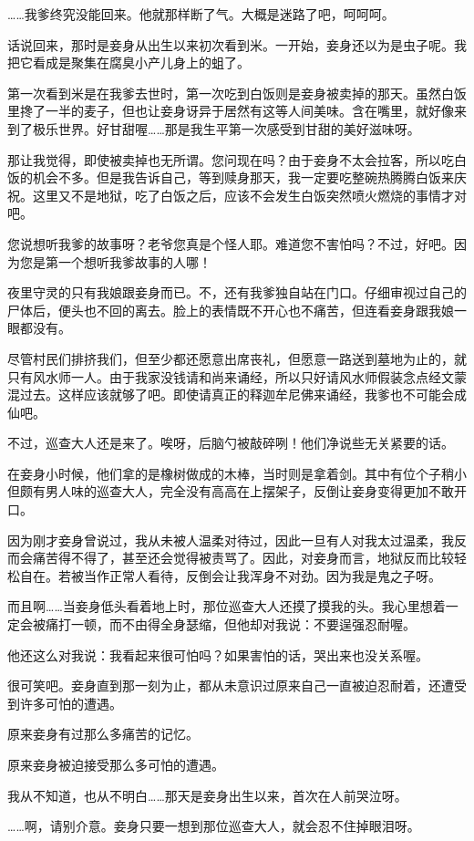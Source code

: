 \documentclass[portrait,a4paper]{article}
\begin{document}
……我爹终究没能回来。他就那样断了气。大概是迷路了吧，呵呵呵。

话说回来，那时是妾身从出生以来初次看到米。一开始，妾身还以为是虫子呢。我把它看成是聚集在腐臭小产儿身上的蛆了。

第一次看到米是在我爹去世时，第一次吃到白饭则是妾身被卖掉的那天。虽然白饭里搀了一半的麦子，但也让妾身讶异于居然有这等人间美味。含在嘴里，就好像来到了极乐世界。好甘甜喔……那是我生平第一次感受到甘甜的美好滋味呀。

那让我觉得，即使被卖掉也无所谓。您问现在吗？由于妾身不太会拉客，所以吃白饭的机会不多。但是我告诉自己，等到赎身那天，我一定要吃整碗热腾腾白饭来庆祝。这里又不是地狱，吃了白饭之后，应该不会发生白饭突然喷火燃烧的事情才对吧。

您说想听我爹的故事呀？老爷您真是个怪人耶。难道您不害怕吗？不过，好吧。因为您是第一个想听我爹故事的人哪！

夜里守灵的只有我娘跟妾身而已。不，还有我爹独自站在门口。仔细审视过自己的尸体后，便头也不回的离去。脸上的表情既不开心也不痛苦，但连看妾身跟我娘一眼都没有。

尽管村民们排挤我们，但至少都还愿意出席丧礼，但愿意一路送到墓地为止的，就只有风水师一人。由于我家没钱请和尚来诵经，所以只好请风水师假装念点经文蒙混过去。这样应该就够了吧。即使请真正的释迦牟尼佛来诵经，我爹也不可能会成仙吧。

不过，巡查大人还是来了。唉呀，后脑勺被敲碎咧！他们净说些无关紧要的话。

在妾身小时候，他们拿的是橡树做成的木棒，当时则是拿着剑。其中有位个子稍小但颇有男人味的巡查大人，完全没有高高在上摆架子，反倒让妾身变得更加不敢开口。

因为刚才妾身曾说过，我从未被人温柔对待过，因此一旦有人对我太过温柔，我反而会痛苦得不得了，甚至还会觉得被责骂了。因此，对妾身而言，地狱反而比较轻松自在。若被当作正常人看待，反倒会让我浑身不对劲。因为我是鬼之子呀。

而且啊……当妾身低头看着地上时，那位巡查大人还摸了摸我的头。我心里想着一定会被痛打一顿，而不由得全身瑟缩，但他却对我说：不要逞强忍耐喔。

他还这么对我说：我看起来很可怕吗？如果害怕的话，哭出来也没关系喔。

很可笑吧。妾身直到那一刻为止，都从未意识过原来自己一直被迫忍耐着，还遭受到许多可怕的遭遇。

原来妾身有过那么多痛苦的记忆。

原来妾身被迫接受那么多可怕的遭遇。

我从不知道，也从不明白……那天是妾身出生以来，首次在人前哭泣呀。

……啊，请别介意。妾身只要一想到那位巡查大人，就会忍不住掉眼泪呀。
\end{document}
